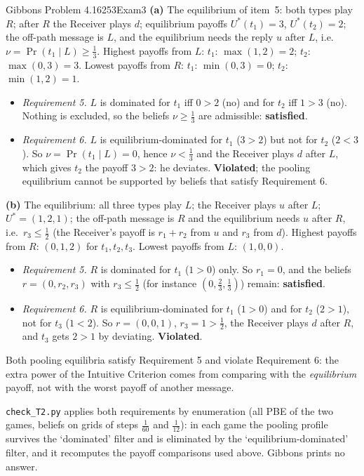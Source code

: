 \begin{exsol}{Gibbons Problem 4.16}{253}{Exam}{3}
\solution \textbf{(a)} The equilibrium of item~5: both types play $R$; after $R$ the Receiver plays $d$;
equilibrium payoffs $U^*(t_1) = 3$, $U^*(t_2) = 2$; the off-path message is $L$, and the equilibrium
needs the reply $u$ after $L$, i.e.\ $\nu = \Pr(t_1 \mid L) \ge \frac13$. Highest payoffs from $L$:
$t_1$: $\max(1, 2) = 2$; $t_2$: $\max(0, 3) = 3$. Lowest payoffs from $R$: $t_1$: $\min(0, 3) = 0$;
$t_2$: $\min(1, 2) = 1$.
\begin{itemize}
  \item \emph{Requirement 5.} $L$ is dominated for $t_1$ iff $0 > 2$ (no) and for $t_2$ iff $1 > 3$ (no).
  Nothing is excluded, so the beliefs $\nu \ge \frac13$ are admissible: \textbf{satisfied}.
  \item \emph{Requirement 6.} $L$ is equilibrium-dominated for $t_1$ ($3 > 2$) but not for $t_2$ ($2 < 3$).
  So $\nu = \Pr(t_1 \mid L) = 0$, hence $\nu < \frac13$ and the Receiver plays $d$ after $L$, which
  gives $t_2$ the payoff $3 > 2$: he deviates. \textbf{Violated}; the pooling equilibrium
  cannot be supported by beliefs that satisfy Requirement 6.
\end{itemize}
\textbf{(b)} The equilibrium: all three types play $L$; the Receiver plays $u$ after $L$; $U^* =
(1, 2, 1)$; the off-path message is $R$ and the equilibrium needs $u$ after $R$, i.e.\ $r_3 \le \frac12$
(the Receiver's payoff is $r_1 + r_2$ from $u$ and $r_3$ from $d$). Highest payoffs from $R$:
$(0, 1, 2)$ for $t_1, t_2, t_3$. Lowest payoffs from $L$: $(1, 0, 0)$.
\begin{itemize}
  \item \emph{Requirement 5.} $R$ is dominated for $t_1$ ($1 > 0$) only. So $r_1 = 0$, and the beliefs
  $r = (0, r_2, r_3)$ with $r_3 \le \frac12$ (for instance $(0, \frac23, \frac13)$) remain: \textbf{satisfied}.
  \item \emph{Requirement 6.} $R$ is equilibrium-dominated for $t_1$ ($1 > 0$) and for $t_2$ ($2 > 1$), not for
  $t_3$ ($1 < 2$). So $r = (0, 0, 1)$, $r_3 = 1 > \frac12$, the Receiver plays $d$ after $R$, and $t_3$
  gets $2 > 1$ by deviating. \textbf{Violated}.
\end{itemize}
Both pooling equilibria satisfy Requirement 5 and violate Requirement 6: the extra power of the
Intuitive Criterion comes from comparing with the \emph{equilibrium} payoff, not with the worst
payoff of another message.

\verify \texttt{check\_T2.py} applies both requirements by enumeration (all PBE of the two games, beliefs
on grids of steps $\frac1{60}$ and $\frac1{12}$): in each game the pooling profile survives the
`dominated' filter and is eliminated by the `equilibrium-dominated' filter, and it recomputes the
payoff comparisons used above. Gibbons prints no answer.

\end{exsol}
